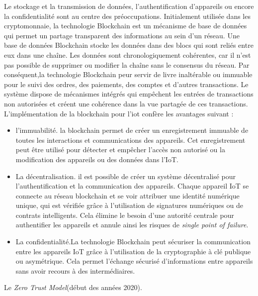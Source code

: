 Le stockage et la transmission de données, l'authentification d'appareils ou encore la confidentialité sont au centre des préoccupations. Initialement utilisée dans les cryptomonnaie, la technologie Blockchain est un mécanisme de base de données qui permet un partage transparent des informations au sein d'un réseau. Une base de données Blockchain stocke les données dans des blocs qui sont reliés entre eux dans une chaîne. Les données sont chronologiquement cohérentes, car il n'est pas possible de supprimer ou modifier la chaîne sans le consensus du réseau. Par conséquent,la technologie Blockchain peur servir de livre inaltérable ou immuable pour le suivi des ordres, des paiements, des comptes et d'autres transactions. Le système dispose de mécanismes intégrés qui empêchent les entrées de transactions non autorisées et créent une cohérence dans la vue partagée de ces transactions. L'implémentation de la blockchain pour l'iot confère les avantages suivant\cite{block} : 
\begin{itemize}
\item l'immuabilité. la blockchain permet de créer un enregistrement immuable de toutes les interactions et communications des appareils. Cet enregistrement peut être utilisé pour détecter et empêcher l'accès non autorisé ou la modification des appareils ou des données dans l'IoT.
\item La décentralisation. il est possible de créer un système décentralisé pour l’authentification et la communication des appareils. Chaque appareil IoT se connecte au réseau blockchain et se voir attribuer une identité numérique unique, qui est vérifiée grâce à l'utilisation de signatures numériques ou de contrats intelligents. Cela élimine le besoin d’une autorité centrale pour authentifier les appareils et annule ainsi les risques de \textit{single point of failure}.
\item La confidentialité.La technologie Blockchain peut sécuriser la communication entre les appareils IoT grâce à l'utilisation de la cryptographie à clé publique ou asymétrique. Cela permet l’échange sécurisé d’informations entre appareils sans avoir recours à des intermédiaires.
\end{itemize}

\vspace{0.1cm}

Le \textit{Zero Trust Model}\cite{zero2}(début des années 2020).

